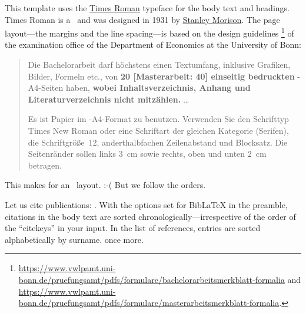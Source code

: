 This template uses the \href{https://en.wikipedia.org/wiki/Times_New_Roman}{Times Roman} typeface for the body text and headings.%
Times Roman is a~ and was designed in 1931 by \href{https://en.wikipedia.org/wiki/Stanley_Morison}{Stanley Morison}. The page layout---the margins and the line spacing---is based on the design guidelines%
\footnote{\url{https://www.vwlpamt.uni-bonn.de/pruefungsamt/pdfs/formulare/bachelorarbeitsmerkblatt-formalia} and \url{https://www.vwlpamt.uni-bonn.de/pruefungsamt/pdfs/formulare/masterarbeitsmerkblatt-formalia}.}
of the examination office of the Department of Economics at the University of Bonn:
\begin{quotation}
	Die Bachelorarbeit darf höchstens einen Textumfang, inklusive Grafiken, Bilder, Formeln etc., von \textbf{20 [Masterarbeit: 40] einseitig bedruckten} -A4-Seiten haben, \textbf{wobei Inhalts\-verzeichnis, Anhang und Literaturverzeichnis nicht mitzählen.} \dots

	Es ist Papier im -A4-Format zu benutzen. Verwenden Sie den Schrifttyp \mbox{Times} New Roman oder eine Schriftart der gleichen Kategorie (Serifen), die Schriftgröße~12, anderthalbfachen Zeilenabstand und Blocksatz. Die Seitenränder sollen links 3~cm sowie rechts, oben und unten 2~cm betragen.
\end{quotation}

This makes for an~ layout. :-( But we follow the orders. \blindtext

Let us cite  publications: \cite{Andersen2008, Andreoni2012, Balakrishnan2016, Lisi1995}.%
With the options set for BibLaTeX in the preamble, citations in the body text are  sorted chronologically---irrespective of the order of the ``citekeys'' in your input. In the list of references, entries are sorted alphabetically by surname. \cite{Andersen2008} once more.

